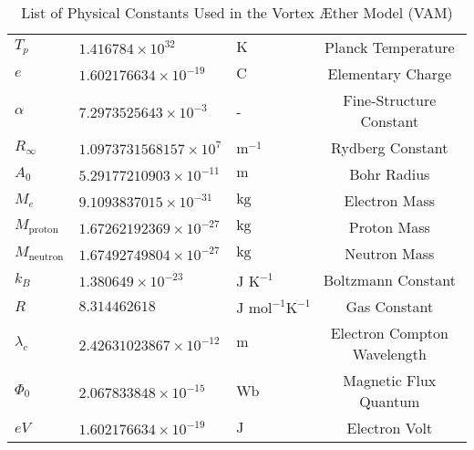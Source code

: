 \documentclass{article}
\begin{document}
\begin{table}[h]
\begin{tabular}{lllc}
            $T_p$ & $1.416784 \times 10^{32}$ & $\text{K}$ & Planck Temperature \\
            $e$ & $1.602176634 \times 10^{-19}$ & $\text{C}$ & Elementary Charge \\
            $\alpha$ & $7.2973525643 \times 10^{-3}$ & - & Fine-Structure Constant \\
            $R_\infty$ & $1.0973731568157 \times 10^7$ & $\text{m}^{-1}$ & Rydberg Constant \\
            $A_0$ & $5.29177210903 \times 10^{-11}$ & $\text{m}$ & Bohr Radius \\
            $M_e$ & $9.1093837015 \times 10^{-31}$ & $\text{kg}$ & Electron Mass \\
            $M_{\text{proton}}$ & $1.67262192369 \times 10^{-27}$ & $\text{kg}$ & Proton Mass \\
            $M_{\text{neutron}}$ & $1.67492749804 \times 10^{-27}$ & $\text{kg}$ & Neutron Mass \\
            $k_B$ & $1.380649 \times 10^{-23}$ & $\text{J K}^{-1}$ & Boltzmann Constant \\
            $R$ & $8.314462618$ & $\text{J mol}^{-1} \text{K}^{-1}$ & Gas Constant \\
            $\lambda_c$ & $2.42631023867 \times 10^{-12}$ & $\text{m}$ & Electron Compton Wavelength \\
            $\Phi_0$ & $2.067833848 \times 10^{-15}$ & $\text{Wb}$ & Magnetic Flux Quantum \\
            $eV$ & $1.602176634 \times 10^{-19}$ & $\text{J}$ & Electron Volt \\
            \bottomrule
        \end{tabular}
        \caption{List of Physical Constants Used in the Vortex \AE ther Model (VAM)}
        \label{tab:vam_constants}
    \end{table}
\end{document}
